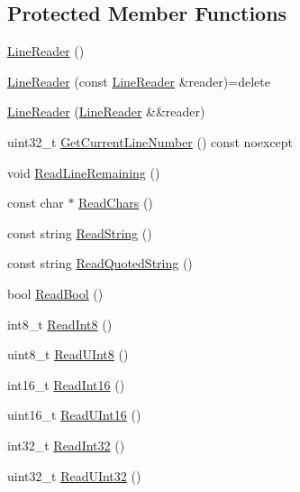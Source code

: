 \subsection*{Protected Member Functions}
\begin{DoxyCompactItemize}
\item 
\hyperlink{classmage_1_1_line_reader_ab4a46321d7ea3ecda2d6390c78a7285b}{Line\+Reader} ()
\item 
\hyperlink{classmage_1_1_line_reader_ae4f871bebae110704b34c0bd88460639}{Line\+Reader} (const \hyperlink{classmage_1_1_line_reader}{Line\+Reader} \&reader)=delete
\item 
\hyperlink{classmage_1_1_line_reader_ad972c7100f726e7b061d864083ba0225}{Line\+Reader} (\hyperlink{classmage_1_1_line_reader}{Line\+Reader} \&\&reader)
\item 
uint32\+\_\+t \hyperlink{classmage_1_1_line_reader_a330af09d4f1b9af3c12f98dc04ac7209}{Get\+Current\+Line\+Number} () const noexcept
\item 
void \hyperlink{classmage_1_1_line_reader_a3a4b99bfef1e8a826d74a01bcc663fcb}{Read\+Line\+Remaining} ()
\item 
const char $\ast$ \hyperlink{classmage_1_1_line_reader_ad915c1a17549c7758c10f0b6db7e5611}{Read\+Chars} ()
\item 
const string \hyperlink{classmage_1_1_line_reader_a58a27b637574ce56ea17a575aa540675}{Read\+String} ()
\item 
const string \hyperlink{classmage_1_1_line_reader_ae9a7547d01b29c3237b198444d4f3aef}{Read\+Quoted\+String} ()
\item 
bool \hyperlink{classmage_1_1_line_reader_a86289c358afe9b3bc5c7789bb8a6af95}{Read\+Bool} ()
\item 
int8\+\_\+t \hyperlink{classmage_1_1_line_reader_a3b88ec3a8555d79b25c2a8818a26f124}{Read\+Int8} ()
\item 
uint8\+\_\+t \hyperlink{classmage_1_1_line_reader_a943ce0074c0861109f8b4ee10df8a221}{Read\+U\+Int8} ()
\item 
int16\+\_\+t \hyperlink{classmage_1_1_line_reader_a5ec3ccfcd1044f6be73c51082d2b57e3}{Read\+Int16} ()
\item 
uint16\+\_\+t \hyperlink{classmage_1_1_line_reader_a89f8d84257eae17db8c1e67d17f839f9}{Read\+U\+Int16} ()
\item 
int32\+\_\+t \hyperlink{classmage_1_1_line_reader_a45c66ad0b4676ef3fb2b5b08f04b509d}{Read\+Int32} ()
\item 
uint32\+\_\+t \hyperlink{classmage_1_1_line_reader_a82d14aede3b4ebff8cc54345dfba2c4b}{Read\+U\+Int32} ()

\end{DoxyCompactItemize}
